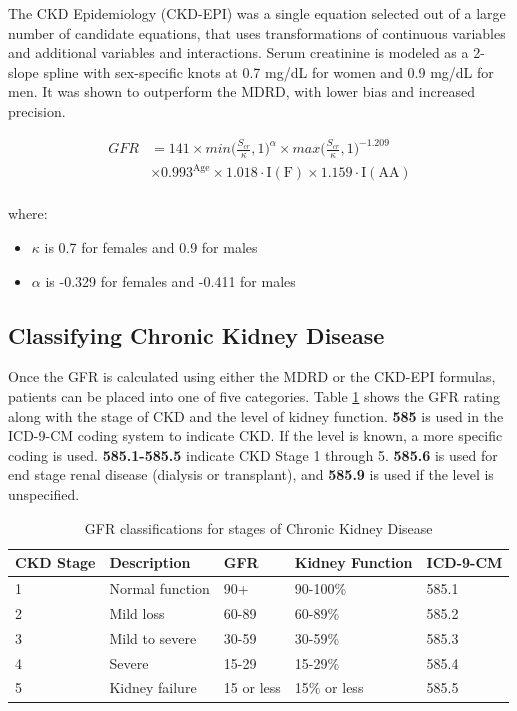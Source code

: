 \documentclass[12pt]{ociamthesis}\usepackage[]{graphicx}\usepackage[]{color}
\begin{document}
The CKD Epidemiology (CKD-EPI) was a single equation selected out of a large number of candidate equations, that uses transformations of continuous
variables and additional variables and interactions. Serum creatinine is modeled as a 2-slope spline with sex-specific knots at 0.7 mg/dL for women 
and 0.9 mg/dL for men. It was shown to outperform the MDRD, with lower bias and increased precision.  \cite{Levey2009, eGFR2018}

\begin{equation} \label{ckdepi}
\begin{split}
  GFR &= 141 \times min\bigg(\frac{S_{cr}}{\kappa}, 1\bigg)^{\alpha} \times max\bigg(\frac{S_{cr}}{\kappa}, 1\bigg)^{-1.209} \\
      &\times 0.993^{\text{Age}} \times 1.018 \cdot \text{I}(\text{F}) \times 1.159 \cdot \text{I}(\text{AA}) \\
\end{split}
\end{equation}

where:
\begin{itemize}
  \item $\kappa$ is 0.7 for females and 0.9 for males
  \item $\alpha$ is -0.329 for females and -0.411 for males
\end{itemize} 

\subsection{Classifying Chronic Kidney Disease}

Once the GFR is calculated using either the MDRD or the CKD-EPI formulas, 
patients can be placed into one of five categories. Table \ref{tab:gfr} shows the 
GFR rating along with the stage of CKD and the level of kidney function. \textbf{585} is used in the ICD-9-CM coding system
to indicate CKD. If the level is known, a more specific coding is used. \textbf{585.1-585.5} indicate CKD Stage 1 through 5.
\textbf{585.6} is used for end stage renal disease (dialysis or transplant), and \textbf{585.9} is used if the level is unspecified.

\begin{table}[]
\centering
\label{my-label}
\begin{tabular}{lllll}
CKD Stage & Description             & GFR        & Kidney Function & ICD-9-CM \\
\hline
1         & Normal function         & 90+        & 90-100\%        & 585.1    \\
2         & Mild loss               & 60-89      & 60-89\%         & 585.2    \\
3         & Mild to severe          & 30-59      & 30-59\%         & 585.3    \\
4         & Severe                  & 15-29      & 15-29\%         & 585.4    \\
5         & Kidney failure          & 15 or less & 15\% or less    & 585.5    \\
\end{tabular}\caption{GFR classifications for stages of Chronic Kidney Disease}\label{tab:gfr}
\end{table}
\end{document}
